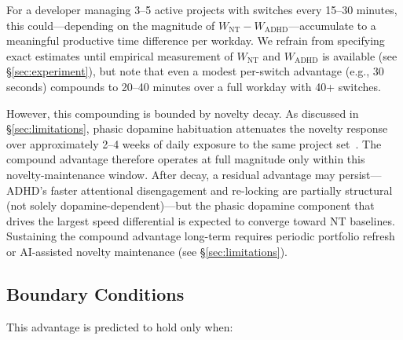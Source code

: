 \documentclass[sigconf,nonacm]{acmart}
\begin{document}
For a developer managing 3--5 active projects with switches every 15--30 minutes, this could---depending on the magnitude of $W_{\text{NT}} - W_{\text{ADHD}}$---accumulate to a meaningful productive time difference per workday. We refrain from specifying exact estimates until empirical measurement of $W_{\text{NT}}$ and $W_{\text{ADHD}}$ is available (see \S\ref{sec:experiment}), but note that even a modest per-switch advantage (e.g., 30 seconds) compounds to 20--40 minutes over a full workday with 40+ switches.

However, this compounding is bounded by novelty decay. As discussed in \S\ref{sec:limitations}, phasic dopamine habituation attenuates the novelty response over approximately 2--4 weeks of daily exposure to the same project set~\cite{grace2001}. The compound advantage therefore operates at full magnitude only within this novelty-maintenance window. After decay, a residual advantage may persist---ADHD's faster attentional disengagement and re-locking are partially structural (not solely dopamine-dependent)---but the phasic dopamine component that drives the largest speed differential is expected to converge toward NT baselines. Sustaining the compound advantage long-term requires periodic portfolio refresh or AI-assisted novelty maintenance (see \S\ref{sec:limitations}).

\subsection{Boundary Conditions}

This advantage is predicted to hold only when:
\end{document}
